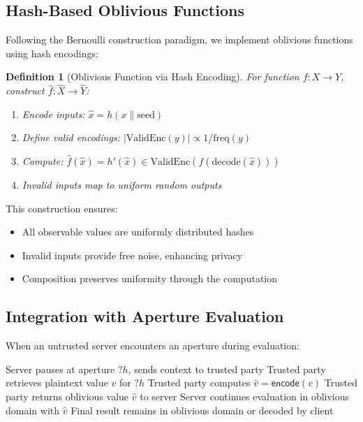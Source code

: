 \documentclass[12pt]{article}
\newtheorem{definition}[theorem]{Definition}
\begin{document}
\subsection{Hash-Based Oblivious Functions}

Following the Bernoulli construction paradigm, we implement oblivious functions using hash encodings:

\begin{definition}[Oblivious Function via Hash Encoding]
For function $f: X \rightarrow Y$, construct $\hat{f}: \hat{X} \rightarrow \hat{Y}$:
\begin{enumerate}
    \item Encode inputs: $\hat{x} = h(x \| \text{seed})$
    \item Define valid encodings: $|\text{ValidEnc}(y)| \propto 1/\text{freq}(y)$
    \item Compute: $\hat{f}(\hat{x}) = h'(\hat{x}) \in \text{ValidEnc}(f(\text{decode}(\hat{x})))$
    \item Invalid inputs map to uniform random outputs
\end{enumerate}
\end{definition}

This construction ensures:
\begin{itemize}
    \item All observable values are uniformly distributed hashes
    \item Invalid inputs provide free noise, enhancing privacy
    \item Composition preserves uniformity through the computation
\end{itemize}

\subsection{Integration with Aperture Evaluation}

When an untrusted server encounters an aperture during evaluation:

\begin{algorithm}
\caption{Oblivious Aperture Protocol}
\begin{algorithmic}[1]
\State Server pauses at aperture $?h$, sends context to trusted party
\State Trusted party retrieves plaintext value $v$ for $?h$
\State Trusted party computes $\hat{v} = \mathsf{encode}(v)$ 
\State Trusted party returns oblivious value $\hat{v}$ to server
\State Server continues evaluation in oblivious domain with $\hat{v}$
\State Final result remains in oblivious domain or decoded by client
\end{algorithmic}
\end{algorithm}
\end{document}
